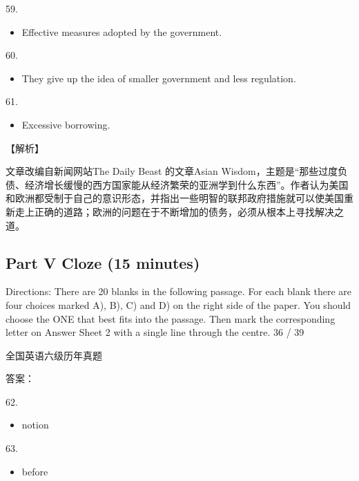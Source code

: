 \documentclass[UTF8,11pt]{ctexart}
\begin{document}
59.


\begin{itemize}[leftmargin=2em,itemsep=.2em,topsep=.4em]\item[B.] Effective measures adopted by the government.
\end{itemize}

60.


\begin{itemize}[leftmargin=2em,itemsep=.2em,topsep=.4em]\item[D.] They give up the idea of smaller government and less regulation.
\end{itemize}

61.


\begin{itemize}[leftmargin=2em,itemsep=.2em,topsep=.4em]\item[D.] Excessive borrowing.
\end{itemize}

【解析】


文章改编自新闻网站The Daily Beast 的文章Asian Wisdom，主题是“那些过度负债、经济增长缓慢的西方国家能从经济繁荣的亚洲学到什么东西”。作者认为美国和欧洲都受制于自己的意识形态，并指出一些明智的联邦政府措施就可以使美国重新走上正确的道路；欧洲的问题在于不断增加的债务，必须从根本上寻找解决之道。


\subsection*{\textbf{Part V} \textbf{Cloze} \textbf{(15 minutes)}}


Directions: There are 20 blanks in the following passage. For each blank there are four choices marked A), B), C) and D) on the right side of the paper. You should choose the ONE that best fits into the passage. Then mark the corresponding letter on Answer Sheet 2 with a single line through the centre. 36 / 39


全国英语六级历年真题


答案：


62.


\begin{itemize}[leftmargin=2em,itemsep=.2em,topsep=.4em]\item[B.] notion
\end{itemize}

63.


\begin{itemize}[leftmargin=2em,itemsep=.2em,topsep=.4em]\item[C.] before
\end{itemize}
\end{document}
